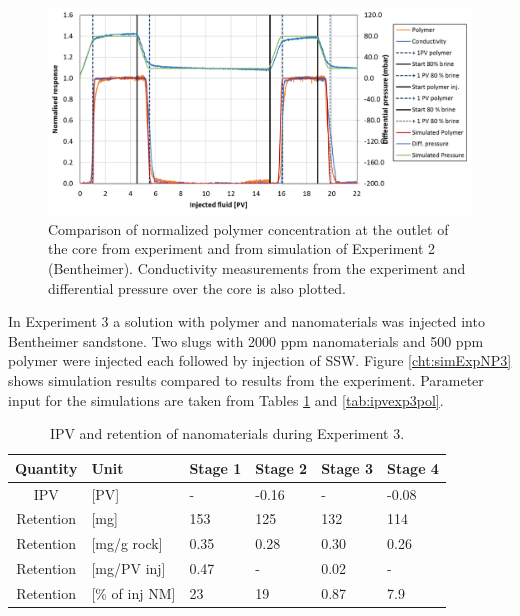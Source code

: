 \documentclass[energies,article,submit,moreauthors,pdftex]{Definitions/mdpi}
\begin{document}
\begin{figure}[h!]
    \centering
    \includegraphics[width=.8\textwidth]{fig/simExpNP2.png}
    \caption{Comparison of normalized polymer concentration at the outlet of the core from experiment and from simulation of Experiment 2 (Bentheimer). Conductivity measurements from the experiment and differential pressure over the core is also plotted.}
    \label{cht:simExpNP2}
\end{figure}

In Experiment 3 a solution with polymer and nanomaterials was injected into Bentheimer sandstone. Two slugs with 2000 ppm nanomaterials and 500 ppm polymer were injected each followed by injection of SSW. Figure \ref{cht:simExpNP3} shows simulation results compared to results from the experiment. Parameter input for the simulations are taken from Tables \ref{tab:ipvexp3} and \ref{tab:ipvexp3pol}.

\begin{table}[h!] 
\small
\centering
\caption{IPV and retention of nanomaterials during Experiment 3.}
\label{tab:ipvexp3}
\begin{tabular}{c l l l l l } 
\toprule
\textbf{Quantity} & \textbf{Unit} & \textbf{Stage 1} & \textbf{Stage 2} & \textbf{Stage 3} & \textbf{Stage 4} \\ 
\midrule 
IPV         & [PV]          & -         & -0.16     & -         & -0.08     \\
Retention   & [mg]          & 153       & 125       & 132       & 114       \\ 
Retention   & [mg/g rock]   & 0.35      & 0.28     & 0.30     & 0.26     \\ 
Retention   & [mg/PV inj]   & 0.47      & -         & 0.02      & -         \\
Retention   & [\% of inj NM]& 23        & 19       & 0.87       & 7.9       \\ 
\bottomrule
\end{tabular}
\end{table}
\end{document}
